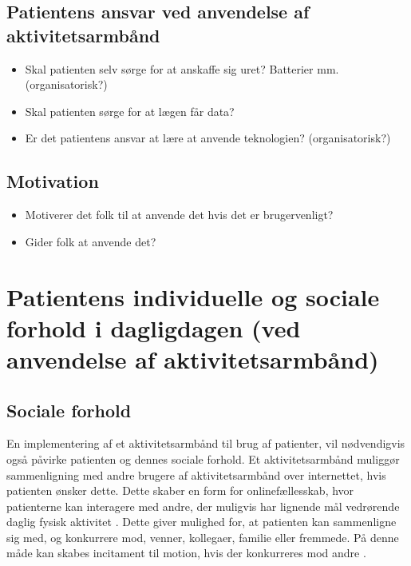 \subsection{Patientens ansvar ved anvendelse af aktivitetsarmbånd}
\begin{itemize}
\item Skal patienten selv sørge for at anskaffe sig uret? Batterier mm. (organisatorisk?)
\item Skal patienten sørge for at lægen får data?
\item Er det patientens ansvar at lære at anvende teknologien? (organisatorisk?)
\end{itemize}

\subsection{Motivation}
\begin{itemize}
\item Motiverer det folk til at anvende det hvis det er brugervenligt?
\item Gider folk at anvende det?
\end{itemize}

\section{Patientens individuelle og sociale forhold i dagligdagen (ved anvendelse af aktivitetsarmbånd)}
\subsection{Sociale forhold}
En implementering af et aktivitetsarmbånd til brug af patienter, vil nødvendigvis også påvirke patienten og dennes sociale forhold. Et aktivitetsarmbånd muliggør sammenligning med andre brugere af aktivitetsarmbånd over internettet, hvis patienten ønsker dette. Dette skaber en form for onlinefællesskab, hvor patienterne kan interagere med andre, der muligvis har lignende mål vedrørende daglig fysisk aktivitet \citep{karapanos2016}. 
Dette giver mulighed for, at patienten kan sammenligne sig med, og konkurrere mod, venner, kollegaer, familie eller fremmede. På denne måde kan skabes incitament til motion, hvis der konkurreres mod andre \citep{rooksby2014}. 


